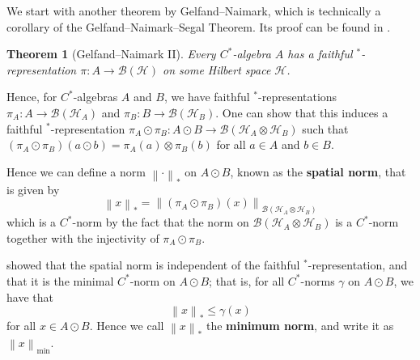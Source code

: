 \documentclass{article}
\theoremstyle{plain}
\newtheorem{theorem}{Theorem}[section]
\theoremstyle{definition}
\theoremstyle{remark}
\newcommand{\norm}[1]{\left\lVert#1\right\rVert}
\begin{document}
We start with another theorem by Gelfand--Naimark,
which is technically a corollary of the Gelfand--Naimark--Segal Theorem.
Its proof can be found in \citet[Theorem 5.19]{speich}.

\begin{theorem}[Gelfand--Naimark II]
	Every $C^*$-algebra $A$ has a faithful $^*$-representation 
	$\pi : A \rightarrow \mathcal{B}(\mathcal{H})$
	on some Hilbert space $\mathcal{H}$.
\end{theorem}

Hence, for $C^*$-algebras $A$ and $B$, we have faithful $^*$-representations
$\pi_A : A \rightarrow \mathcal{B}(\mathcal{H}_A)$
and
$\pi_B : B \rightarrow \mathcal{B}(\mathcal{H}_B)$.
One can show 
\citep[Corollary 11.15]{courtney2023notes}
that this induces a faithful $^*$-representation
$\pi_A \odot \pi_B : A \odot B \rightarrow \mathcal{B}(\mathcal{H}_A \otimes \mathcal{H}_B)$
such that 
$(\pi_A \odot \pi_B)(a \odot b) = \pi_A(a) \otimes \pi_B(b)$
for all $a \in A$ and $b \in B$.

Hence we can define a norm $\norm{\cdot}_*$ on $A \odot B$, 
known as the \textbf{spatial norm},
that is given by
\begin{equation}
	\norm{x}_* = \norm{(\pi_A \odot \pi_B)(x)}_{\mathcal{B}(\mathcal{H}_A \otimes \mathcal{H}_B)}
\end{equation}
which is a $C^*$-norm by the fact that the norm on $\mathcal{B}(\mathcal{H}_A \otimes \mathcal{H}_B)$
is a $C^*$-norm together with the injectivity of $\pi_A \odot \pi_B$.

\citet{Takesaki2002} showed
that the spatial norm is independent
of the faithful $^*$-representation, and that it is the minimal
$C^*$-norm on $A \odot B$; that is, for all $C^*$-norms $\gamma$ 
on $A \odot B$,
we have that
\begin{equation}
	\norm{x}_* \leq \gamma(x)
\end{equation}
for all $x \in A \odot B$.
Hence we call $\norm{x}_*$ the \textbf{minimum norm}, and write it as
$\norm{x}_{\min}$.

\end{document}
